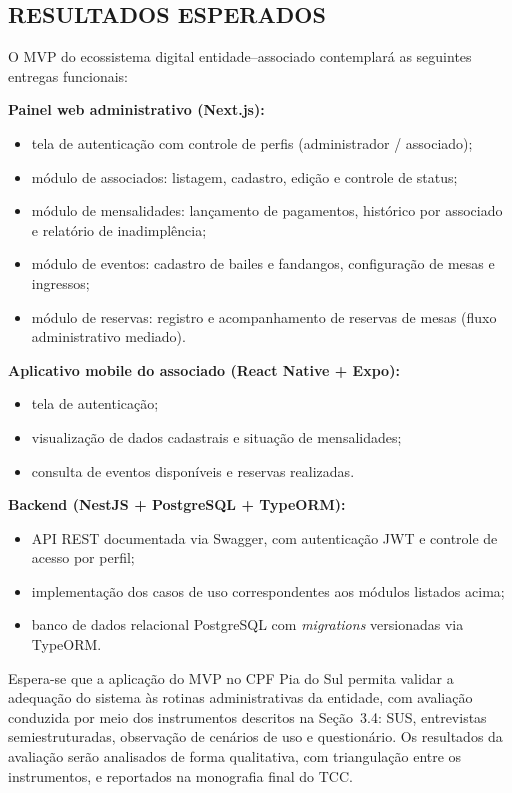 ﻿\documentclass[12pt,a4paper]{article}
\begin{document}
\subsection{RESULTADOS ESPERADOS}

O MVP do ecossistema digital entidade--associado contemplará as seguintes entregas funcionais:

\textbf{Painel web administrativo (Next.js):}
\begin{itemize}[leftmargin=*]
    \item tela de autenticação com controle de perfis (administrador / associado);
    \item módulo de associados: listagem, cadastro, edição e controle de status;
    \item módulo de mensalidades: lançamento de pagamentos, histórico por associado e relatório de inadimplência;
    \item módulo de eventos: cadastro de bailes e fandangos, configuração de mesas e ingressos;
    \item módulo de reservas: registro e acompanhamento de reservas de mesas (fluxo administrativo mediado).
\end{itemize}

\textbf{Aplicativo mobile do associado (React Native + Expo):}
\begin{itemize}[leftmargin=*]
    \item tela de autenticação;
    \item visualização de dados cadastrais e situação de mensalidades;
    \item consulta de eventos disponíveis e reservas realizadas.
\end{itemize}

\textbf{Backend (NestJS + PostgreSQL + TypeORM):}
\begin{itemize}[leftmargin=*]
    \item API REST documentada via Swagger, com autenticação JWT e controle de acesso por perfil;
    \item implementação dos casos de uso correspondentes aos módulos listados acima;
    \item banco de dados relacional PostgreSQL com \textit{migrations} versionadas via TypeORM.
\end{itemize}

Espera-se que a aplicação do MVP no CPF Pia do Sul permita validar a adequação do sistema às rotinas administrativas da entidade, com avaliação conduzida por meio dos instrumentos descritos na Seção~3.4: SUS, entrevistas semiestruturadas, observação de cenários de uso e questionário. Os resultados da avaliação serão analisados de forma qualitativa, com triangulação entre os instrumentos, e reportados na monografia final do TCC.
\end{document}
